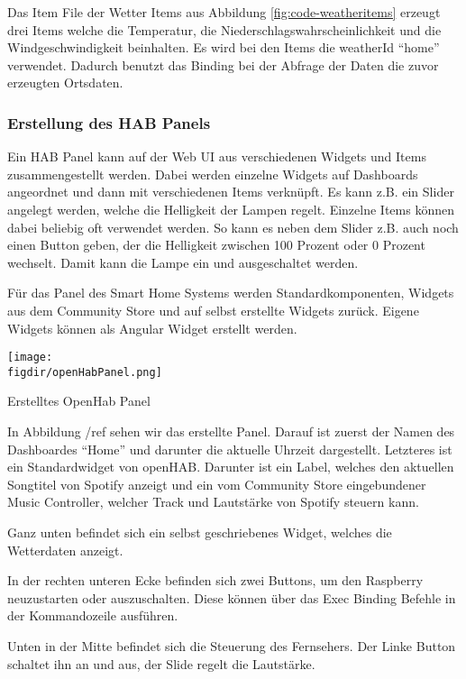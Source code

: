 		Das Item File der Wetter Items aus Abbildung \ref{fig:code-weatheritems} erzeugt drei Items welche die Temperatur, die Niederschlagswahrscheinlichkeit und die Windgeschwindigkeit beinhalten.
		Es wird bei den Items die weatherId "`home"' verwendet. Dadurch benutzt das Binding bei der Abfrage der Daten die zuvor erzeugten Ortsdaten.
		
		\subsubsection{Erstellung des HAB Panels}
		Ein HAB Panel kann auf der Web UI aus verschiedenen Widgets und Items zusammengestellt werden. Dabei werden einzelne Widgets auf Dashboards angeordnet und dann mit verschiedenen Items verknüpft. Es kann z.B. ein Slider angelegt werden, welche die Helligkeit der Lampen regelt. Einzelne Items können dabei beliebig oft verwendet werden. So kann es neben dem Slider z.B. auch noch einen Button geben, der die Helligkeit zwischen 100 Prozent oder 0 Prozent wechselt. Damit kann die Lampe ein und ausgeschaltet werden.
		
		Für das Panel des Smart Home Systems werden Standardkomponenten, Widgets aus dem Community Store und auf selbst erstellte Widgets zurück. Eigene Widgets können als Angular Widget erstellt werden.
		
	\begin{minipage}{\textwidth}
		\centering
		\captionsetup{type=figure}
		\texttt{[image: \\figdir/openHabPanel.png]}
		\caption{Erstelltes OpenHab Panel \label{fig:activity-diagram}}
	\end{minipage}
		
		In Abbildung /ref{} sehen wir das erstellte Panel. Darauf ist zuerst der Namen des Dashboardes "`Home"' und darunter die aktuelle Uhrzeit dargestellt. Letzteres ist ein Standardwidget von openHAB.
		Darunter ist ein Label, welches den aktuellen Songtitel von Spotify anzeigt und ein vom Community Store eingebundener Music Controller, welcher Track und Lautstärke von Spotify steuern kann.

		Ganz unten befindet sich ein selbst geschriebenes Widget, welches die Wetterdaten anzeigt.

		In der rechten unteren Ecke befinden sich zwei Buttons, um den Raspberry neuzustarten oder auszuschalten. Diese können über das Exec Binding Befehle in der Kommandozeile ausführen.
		
		Unten in der Mitte befindet sich die Steuerung des Fernsehers. Der Linke Button schaltet ihn an und aus, der Slide regelt die Lautstärke.
		
